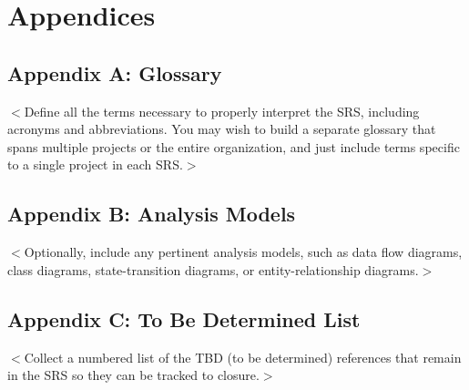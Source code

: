 \documentclass[oneside,a4paper,12pt,explicit]{book}
\begin{document}
\chapter{Appendices}
\section{Appendix A: Glossary}
$<$Define all the terms necessary to properly interpret the SRS, including 
acronyms and abbreviations. You may wish to build a separate glossary that spans 
multiple projects or the entire organization, and just include terms specific to 
a single project in each SRS.$>$

\section{Appendix B: Analysis Models}
$<$Optionally, include any pertinent analysis models, such as data flow 
diagrams, class diagrams, state-transition diagrams, or entity-relationship 
diagrams.$>$

\section{Appendix C: To Be Determined List}
$<$Collect a numbered list of the TBD (to be determined) references that remain 
in the SRS so they can be tracked to closure.$>$
\cleardoublepage
{}
\printindex
\end{document}
